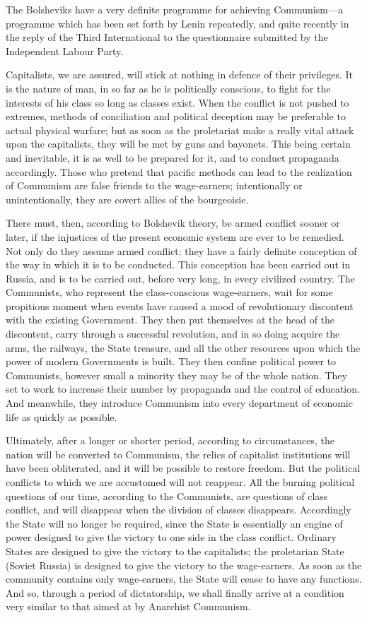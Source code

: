 The Bolsheviks have a very definite programme for achieving Communism---a programme which has been set forth by Lenin repeatedly, and quite recently in the reply of the Third International to the questionnaire submitted by the Independent Labour Party.

Capitalists, we are assured, will stick at nothing in defence of their privileges. It is the nature of man, in so far as he is politically conscious, to fight for the interests of his class so long as classes exist. When the conflict is not pushed to extremes, methods of conciliation and political deception may be preferable to actual physical warfare; but as soon as the proletariat make a really vital attack upon the capitalists, they will be met by guns and bayonets. This being certain and inevitable, it is as well to be prepared for it, and to conduct propaganda accordingly. Those who pretend that pacific methods can lead to the realization of Communism are false friends to the wage-earners; intentionally or unintentionally, they are covert allies of the bourgeoisie.

There must, then, according to Bolshevik theory, be armed conflict sooner or later, if the injustices of the present economic system are ever to be remedied. Not only do they assume armed conflict: they have a fairly definite conception of the way in which it is to be conducted. This conception has been carried out in Russia, and is to be carried out, before very long, in every civilized country. The Communists, who represent the class-conscious wage-earners, wait for some propitious moment when events have caused a mood of revolutionary discontent with the existing Government. They then put themselves at the head of the discontent, carry through a successful revolution, and in so doing acquire the arms, the railways, the State treasure, and all the other resources upon which the power of modern Governments is built. They then confine political power to Communists, however small a minority they may be of the whole nation. They set to work to increase their number by propaganda and the control of education. And meanwhile, they introduce Communism into every department of economic life as quickly as possible.

Ultimately, after a longer or shorter period, according to circumstances, the nation will be converted to Communism, the relics of capitalist institutions will have been obliterated, and it will be possible to restore freedom. But the political conflicts to which we are accustomed will not reappear. All the burning political questions of our time, according to the Communists, are questions of class conflict, and will disappear when the division of classes disappears. Accordingly the State will no longer be required, since the State is essentially an engine of power designed to give the victory to one side in the class conflict. Ordinary States are designed to give the victory to the capitalists; the proletarian State (Soviet Russia) is designed to give the victory to the wage-earners. As soon as the community contains only wage-earners, the State will cease to have any functions. And so, through a period of dictatorship, we shall finally arrive at a condition very similar to that aimed at by Anarchist Communism.

